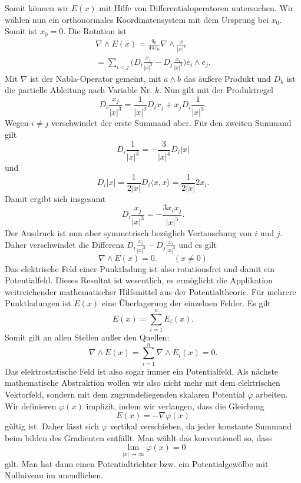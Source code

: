 \documentclass[a4paper,11pt,fleqn,twocolumn,twoside,dvipdfmx]{scrartcl}
\begin{document}
Somit können wir $E(x)$ mit Hilfe von Differentialoperatoren
untersuchen. Wir wählen nun ein orthonormales Koordinatensystem
mit dem Ursprung bei $x_0$. Somit ist $x_0=0$. Die Rotation
ist
\begin{gather*}
\nabla\wedge E(x)
= \frac{q_0}{4\pi\varepsilon_0}\nabla\wedge\frac{x}{|x|^3}\\
= \sum_{i<j} \Big(D_i\frac{x_j}{|x|^3}-D_j\frac{x_i}{|x|^3}\Big)
e_i\wedge e_j.
\end{gather*}
Mit $\nabla$ ist der Nabla-Operator gemeint, mit $a\wedge b$
das äußere Produkt und $D_k$ ist die partielle Ableitung nach
Variable Nr. $k$. Nun gilt mit der Produktregel
\[D_i \frac{x_j}{|x|^3}
= \frac{1}{|x|^3}D_i x_j+x_jD_i\frac{1}{|x|^3}.\]
Wegen $i\ne j$ verschwindet der erste Summand aber.
Für den zweiten Summand gilt
\[D_i\frac{1}{|x|^3} = -\frac{3}{|x|^4}D_i|x|\]
und
\[D_i|x| = \frac{1}{2|x|}D_i\langle x,x\rangle
= \frac{1}{2|x|} 2x_i.\]
Damit ergibt sich insgesamt
\[D_i \frac{x_j}{|x|^3}
= -\frac{3x_ix_j}{|x|^5}.\]
Der Ausdruck ist nun aber symmetrisch bezüglich Vertauschung
von $i$ und $j$. Daher verschwindet die Differenz
$D_i\frac{x_j}{|x|^3}-D_j\frac{x_i}{|x|^3}$
und es gilt
\begin{equation}
\nabla\wedge E(x)=0.\qquad (x\ne 0)
\end{equation}
Das elektrische Feld einer Punktladung ist also rotationsfrei
und damit ein Potentialfeld. Dieses Resultat ist wesentlich, es
ermöglicht die Applikation weitreichender mathematischer Hilfsmittel
aus der Potentialtheorie. Für mehrere Punktladungen ist
$E(x)$ eine Überlagerung der einzelnen Felder. Es gilt
\[E(x) = \sum_{i=1}^n E_i(x).\]
Somit gilt an allen Stellen außer den Quellen:
\[\nabla\wedge E(x) = \sum_{i=1}^n \nabla\wedge E_i(x)=0.\]
Das elektrostatische Feld ist also sogar immer ein
Potentialfeld. Als nächste mathematische Abstraktion wollen wir
also nicht mehr mit dem elektrischen Vektorfeld, sondern mit
dem zugrundeliegenden skalaren Potential $\varphi$ arbeiten.
Wir definieren $\varphi(x)$ implizit, indem wir verlangen, dass die
Gleichung
\begin{equation}\label{eq:phi-implizit}
E(x)=-\nabla\varphi(x)
\end{equation}
gültig ist. Daher lässt sich $\varphi$ vertikal verschieben, da
jeder konstante Summand beim bilden des Gradienten entfällt.
Man wählt das konventionell so, dass
\[\lim_{|x|\rightarrow\infty}\varphi(x)=0\]
gilt. Man hat dann einen Potentialtrichter bzw.
ein Potentialgewölbe mit Nullniveau im unendlichen.
\end{document}

